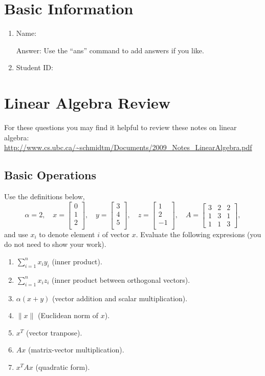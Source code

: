 \documentclass{article}
\def\ans#1{\par\gre{Answer: #1}}
\def\blu#1{{\color{blu}#1}}
\def\gre#1{{\color{gre}#1}}
\def\norm#1{\|#1\|}
\def\enum#1{\begin{enumerate}#1\end{enumerate}}
\begin{document}
\section*{Basic Information}


\blu{\enum{
\item Name:
\ans{
Use the ``ans'' command to add answers if you like.
}
\item Student ID:
}
}


\section{Linear Algebra Review}

For these questions you may find it helpful to review these notes on linear algebra:\\
\url{http://www.cs.ubc.ca/~schmidtm/Documents/2009_Notes_LinearAlgebra.pdf}

\subsection{Basic Operations}

Use the definitions below,
\[
\alpha = 2,\quad
x = \left[\begin{array}{c}
0\\
1\\
2\\
\end{array}\right], \quad 
y = \left[\begin{array}{c}
3\\
4\\
5\\
\end{array}\right],\quad
z = \left[\begin{array}{c}
1\\
2\\
-1\\
\end{array}\right],\quad
A = \left[\begin{array}{ccc}
3 & 2 & 2\\
1 & 3 & 1\\
1 & 1 & 3
\end{array}\right],
\]
and use $x_i$ to denote element $i$ of vector $x$.
\blu{Evaluate the following expresions} (you do not need to show your work).
\enum{
\item $\sum_{i=1}^n x_iy_i$ (inner product).
\item $\sum_{i=1}^n x_iz_i$ (inner product between orthogonal vectors).
\item $\alpha(x+y)$ (vector addition and scalar multiplication).
\item $\norm{x}$ (Euclidean norm of $x$).
\item $x^T$ (vector tranpose).
\item $Ax$ (matrix-vector multiplication).
\item $x^TAx$ (quadratic form).
}
\end{document}
